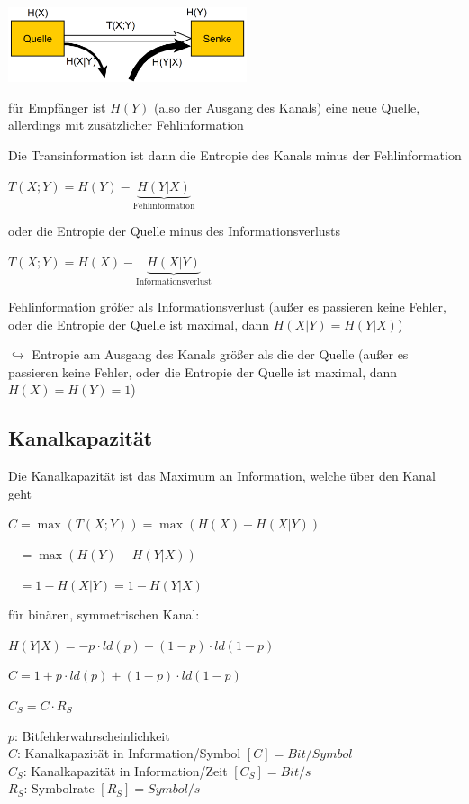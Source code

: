 \includegraphics[width=7cm]{img/entropiemodell.PNG}

für Empfänger ist $H(Y)$ (also der Ausgang des Kanals) eine neue Quelle, allerdings mit zusätzlicher Fehlinformation

Die Transinformation ist dann die Entropie des Kanals minus der Fehlinformation

$\displaystyle{
    T(X;Y) = H(Y) - \underbrace{H(Y|X)}_{\text{Fehlinformation}}
}$

oder die Entropie der Quelle minus des Informationsverlusts

$\displaystyle{
    T(X;Y) = H(X) - \underbrace{H(X|Y)}_{\text{Informationsverlust}}
}$

Fehlinformation größer als Informationsverlust (außer es passieren keine Fehler,
oder die Entropie der Quelle ist maximal, dann $H(X|Y) = H(Y|X)$)

$\hookrightarrow$ Entropie am Ausgang des Kanals größer als die der Quelle (außer es passieren keine Fehler, oder die
Entropie der Quelle ist maximal, dann $H(X) = H(Y) = 1$)

\subsection{Kanalkapazität}

Die Kanalkapazität ist das Maximum an Information, welche über den Kanal geht

$\displaystyle{
    C = \max(T(X;Y)) = \max(H(X) - H(X|Y))
}$

$\displaystyle{
\;\;\;= \max(H(Y) - H(Y|X))
}$

$\displaystyle{
\;\;\;= 1 - H(X|Y) = 1 - H(Y|X)
}$

für binären, symmetrischen Kanal:

$\displaystyle{
    H(Y|X) = -p \cdot ld(p) - (1 - p) \cdot ld(1 - p)
}$

$\displaystyle{
    C = 1 + p \cdot ld(p) + (1 - p) \cdot ld(1 - p)
}$

$\displaystyle{
    C_S = C \cdot R_S
}$

$p$: Bitfehlerwahrscheinlichkeit\\
$C$: Kanalkapazität in Information/Symbol $[C] = Bit/Symbol$\\
$C_S$: Kanalkapazität in Information/Zeit $[C_S] = Bit/s$\\
$R_S$: Symbolrate $[R_S] = Symbol/s$

